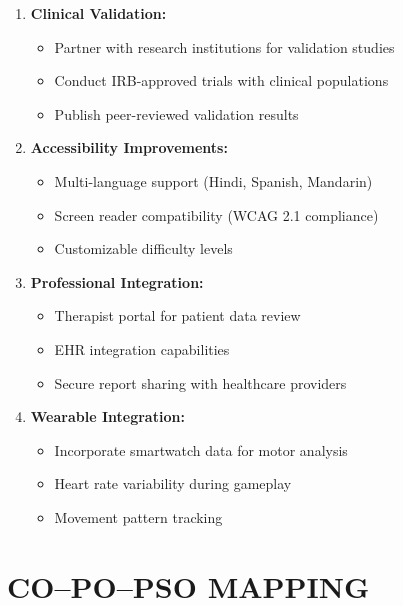 \documentclass[12pt,letterpaper]{article}
\begin{document}
\begin{enumerate}
    \item \textbf{Clinical Validation:}
    \begin{itemize}
        \item Partner with research institutions for validation studies
        \item Conduct IRB-approved trials with clinical populations
        \item Publish peer-reviewed validation results
    \end{itemize}
    
    \item \textbf{Accessibility Improvements:}
    \begin{itemize}
        \item Multi-language support (Hindi, Spanish, Mandarin)
        \item Screen reader compatibility (WCAG 2.1 compliance)
        \item Customizable difficulty levels
    \end{itemize}
    
    \item \textbf{Professional Integration:}
    \begin{itemize}
        \item Therapist portal for patient data review
        \item EHR integration capabilities
        \item Secure report sharing with healthcare providers
    \end{itemize}
    
    \item \textbf{Wearable Integration:}
    \begin{itemize}
        \item Incorporate smartwatch data for motor analysis
        \item Heart rate variability during gameplay
        \item Movement pattern tracking
    \end{itemize}
\end{enumerate}

\newpage


\section*{CO--PO--PSO MAPPING}
\end{document}
